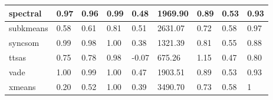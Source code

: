 \begin{table}[H]
\begin{tabular}{|l|l|l|l|l|l|l|l|l|}
\hline
spectral & 0.97 & 0.96 & 0.99 & 0.48 & 1969.90 & 0.89 & 0.53 & 0.93 \\
\hline
subkmeans & 0.58 & 0.61 & 0.81 & 0.51 & 2631.07 & 0.72 & 0.58 & 0.97 \\
\hline
syncsom & 0.99 & 0.98 & 1.00 & 0.38 & 1321.39 & 0.81 & 0.55 & 0.88 \\
\hline
ttsas & 0.75 & 0.78 & 0.98 & -0.07 & 675.26 & 1.15 & 0.47 & 0.80 \\
\hline
vade & 1.00 & 0.99 & 1.00 & 0.47 & 1903.51 & 0.89 & 0.53 & 0.93 \\
\hline
xmeans & 0.20 & 0.52 & 1.00 & 0.39 & 3490.70 & 0.73 & 0.58 & 1 \\
\hline
\end{tabular}
\end{table}